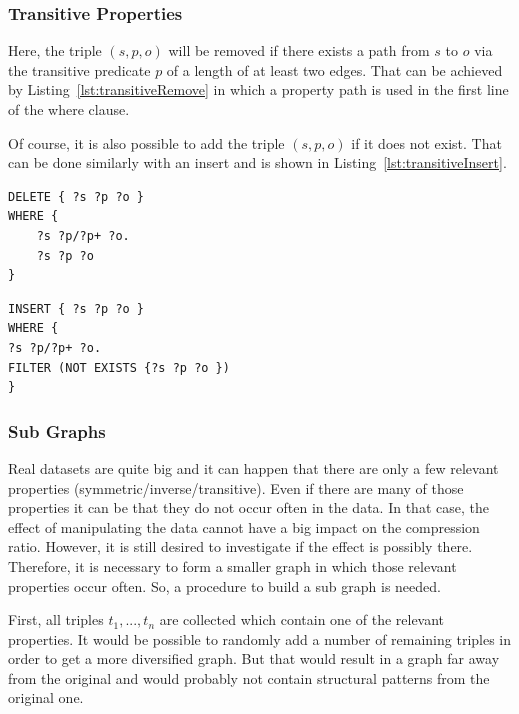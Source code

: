 \subsubsection{Transitive Properties}

Here, the triple $(s,p,o)$ will be removed if there exists a path from $s$ to $o$ via the transitive predicate $p$ of a length of at least two edges. That can be achieved by Listing~\ref{lst:transitiveRemove} in which a property path is used in the first line of the where clause.

Of course, it is also possible to add the triple $(s,p,o)$ if it does not exist. That can be done similarly with an insert and is shown in Listing~\ref{lst:transitiveInsert}.

\begin{lstlisting}[captionpos=b, caption=SPARQL update for removing triples with the transitive property p., label=lst:transitiveRemove,
basicstyle=\ttfamily,frame=single,float=hbt,]
DELETE { ?s ?p ?o }
WHERE { 
	?s ?p/?p+ ?o. 
	?s ?p ?o 
}
\end{lstlisting}


\begin{lstlisting}[captionpos=b, caption=SPARQL update for adding triples with the transitive property p., label=lst:transitiveInsert,
basicstyle=\ttfamily,frame=single,float=hbt,]
INSERT { ?s ?p ?o }
WHERE { 
?s ?p/?p+ ?o. 
FILTER (NOT EXISTS {?s ?p ?o })
}
\end{lstlisting}

\subsubsection{Sub Graphs}\label{sec:implementationSubGraphs}

Real datasets are quite big and it can happen that there are only a few relevant properties (symmetric/inverse/transitive). Even if there are many of those properties it can be that they do not occur often in the data. In that case, the effect of manipulating the data cannot have a big impact on the compression ratio. However, it is still desired to investigate if the effect is possibly there. Therefore, it is necessary to form a smaller graph in which those relevant properties occur often. So, a procedure to build a sub graph is needed.

First, all triples $t_1,...,t_n$ are collected which contain one of the relevant properties. It would be possible to randomly add a number of remaining triples in order to get a more diversified graph. But that would result in a graph far away from the original and would probably not contain structural patterns from the original one.

